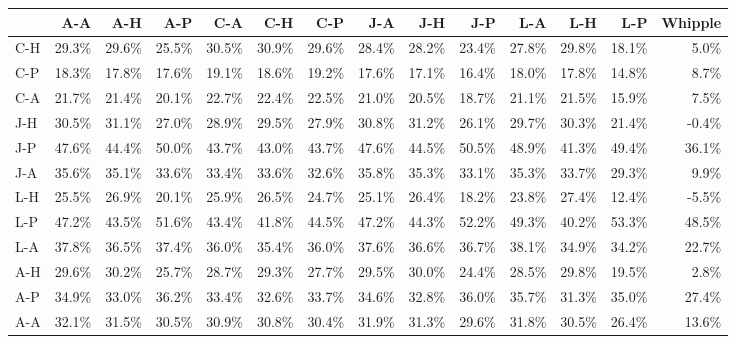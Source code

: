 \begin{tabular}{lrrrrrrrrrrrrr}
\toprule
{} &   A-A &   A-H &   A-P &   C-A &   C-H &   C-P &   J-A &   J-H &   J-P &   L-A &   L-H &   L-P &  Whipple \\
\midrule
C-H & 29.3\% & 29.6\% & 25.5\% & 30.5\% & 30.9\% & 29.6\% & 28.4\% & 28.2\% & 23.4\% & 27.8\% & 29.8\% & 18.1\% &     5.0\% \\
C-P & 18.3\% & 17.8\% & 17.6\% & 19.1\% & 18.6\% & 19.2\% & 17.6\% & 17.1\% & 16.4\% & 18.0\% & 17.8\% & 14.8\% &     8.7\% \\
C-A & 21.7\% & 21.4\% & 20.1\% & 22.7\% & 22.4\% & 22.5\% & 21.0\% & 20.5\% & 18.7\% & 21.1\% & 21.5\% & 15.9\% &     7.5\% \\
J-H & 30.5\% & 31.1\% & 27.0\% & 28.9\% & 29.5\% & 27.9\% & 30.8\% & 31.2\% & 26.1\% & 29.7\% & 30.3\% & 21.4\% &    -0.4\% \\
J-P & 47.6\% & 44.4\% & 50.0\% & 43.7\% & 43.0\% & 43.7\% & 47.6\% & 44.5\% & 50.5\% & 48.9\% & 41.3\% & 49.4\% &    36.1\% \\
J-A & 35.6\% & 35.1\% & 33.6\% & 33.4\% & 33.6\% & 32.6\% & 35.8\% & 35.3\% & 33.1\% & 35.3\% & 33.7\% & 29.3\% &     9.9\% \\
L-H & 25.5\% & 26.9\% & 20.1\% & 25.9\% & 26.5\% & 24.7\% & 25.1\% & 26.4\% & 18.2\% & 23.8\% & 27.4\% & 12.4\% &    -5.5\% \\
L-P & 47.2\% & 43.5\% & 51.6\% & 43.4\% & 41.8\% & 44.5\% & 47.2\% & 44.3\% & 52.2\% & 49.3\% & 40.2\% & 53.3\% &    48.5\% \\
L-A & 37.8\% & 36.5\% & 37.4\% & 36.0\% & 35.4\% & 36.0\% & 37.6\% & 36.6\% & 36.7\% & 38.1\% & 34.9\% & 34.2\% &    22.7\% \\
A-H & 29.6\% & 30.2\% & 25.7\% & 28.7\% & 29.3\% & 27.7\% & 29.5\% & 30.0\% & 24.4\% & 28.5\% & 29.8\% & 19.5\% &     2.8\% \\
A-P & 34.9\% & 33.0\% & 36.2\% & 33.4\% & 32.6\% & 33.7\% & 34.6\% & 32.8\% & 36.0\% & 35.7\% & 31.3\% & 35.0\% &    27.4\% \\
A-A & 32.1\% & 31.5\% & 30.5\% & 30.9\% & 30.8\% & 30.4\% & 31.9\% & 31.3\% & 29.6\% & 31.8\% & 30.5\% & 26.4\% &    13.6\% \\
\bottomrule
\end{tabular}
